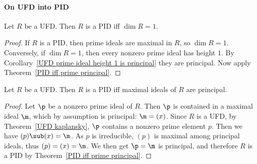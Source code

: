 \paragraph{On UFD into PID}
\begin{proposition}\label{UFD PID dim=1}
Let $R$ be a UFD. Then $R$ is a PID iff $\dim R=1$.
\end{proposition}
\begin{proof}
If $R$ is a PID, then prime ideals are maximal in $R$, so $\dim R=1$. Conversely, if $\dim R=1$, then every nonzero prime ideal has height $1$. By Corollary~\ref{UFD prime ideal height 1 is principal} they are principal. Now apply Theorem~\ref{PID iff prime principal}.
\end{proof}
\begin{proposition}
Let $R$ be a UFD. Then $R$ is a PID iff maximal ideals of $R$ are principal.
\end{proposition}
\begin{proof}
Let $\p$ be a nonzero prime ideal of $R$. Then $\p$ is contained in a maximal ideal $\m$, which by assumption is principal: $\m=(x)$. Since $R$ is a UFD, by Theorem~\ref{UFD kaplansky}, $\p$ contains a nonzero prime element $p$. Then we have $(p)\sub(x)=\m$. As $p$ is irreducible, $(p)$ is maximal among principal ideals, thus $(p)=(x)=\m$. We then get $\p=\m$ is principal, and therefore $R$ is a PID by Theorem~\ref{PID iff prime principal}.
\end{proof}
